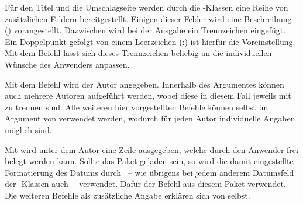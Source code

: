 \begin{Declaration*}{}
\begin{Declaration*}{}
\begin{Declaration*}{}
\begin{Declaration}{}
\printdeclarationlist%
%
%
Für den Titel und die Umschlagseite werden durch die \TUDScript-Klassen eine 
Reihe von zusätzlichen Feldern bereitgestellt. Einigen dieser Felder wird eine 
Beschreibung () vorangestellt. Dazwischen 
wird bei der Ausgabe ein Trennzeichen eingefügt. Ein Doppelpunkt gefolgt von 
einem Leerzeichen (:) ist hierfür die Voreinstellung. Mit 
dem Befehl  lässt sich dieses Trennzeichen beliebig an 
die individuellen Wünsche des Anwenders anpassen.
\end{Declaration}

\begin{Declaration}{}
\begin{Declaration}{}
\begin{Declaration}{}
\begin{Declaration}{}
\begin{Declaration}{}
\begin{Declaration}{}
\printdeclarationlist%
%
%
%
%
Mit dem Befehl  wird der Autor angegeben. Innerhalb des 
Argumentes können auch mehrere Autoren aufgeführt werden, wobei diese in diesem 
Fall jeweils mit  zu trennen sind. Alle weiteren hier vorgestellten 
Befehle können selbst im Argument von  verwendet werden, wodurch 
für jeden Autor individuelle Angaben möglich sind.

Mit  wird unter dem Autor eine Zeile ausgegeben, welche 
durch den Anwender frei belegt werden kann. Sollte das Paket  
geladen sein, so wird die damit eingestellte Formatierung des Datums durch 
~-- wie übrigens bei jedem anderem Datumsfeld der 
\TUDScript-Klassen auch~-- verwendet. Dafür der Befehl  aus 
diesem Paket verwendet. Die weiteren Befehle als zusätzliche Angabe erklären 
sich von selbst.
\end{Declaration}
\end{Declaration}
\end{Declaration}
\end{Declaration}
\end{Declaration}
\end{Declaration}


\end{Declaration*}
\end{Declaration*}
\end{Declaration*}
